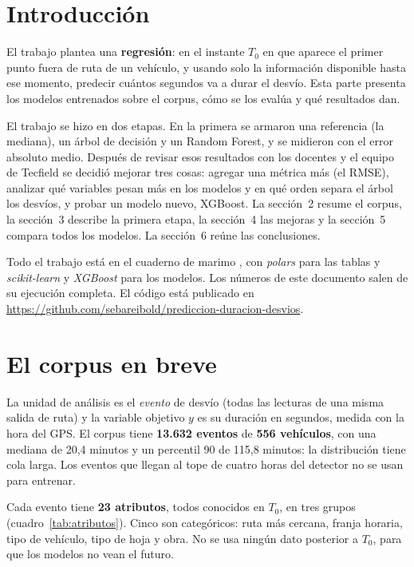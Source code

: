\documentclass[11pt,a4paper]{article}
\newcommand{\campo}[1]{\texttt{\detokenize{#1}}}
\begin{document}
\tableofcontents
\newpage

\section{Introducción}

El trabajo plantea una \textbf{regresión}: en el instante $T_0$ en que aparece el primer punto fuera de
ruta de un vehículo, y usando solo la información disponible hasta ese momento, predecir cuántos
segundos va a durar el desvío. Esta parte presenta los modelos entrenados sobre el corpus, cómo se los
evalúa y qué resultados dan.

El trabajo se hizo en dos etapas. En la primera se armaron una referencia (la mediana), un árbol de
decisión y un Random Forest, y se midieron con el error absoluto medio. Después de revisar esos
resultados con los docentes y el equipo de Tecfield se decidió mejorar tres cosas: agregar una métrica
más (el RMSE), analizar qué variables pesan más en los modelos y en qué orden separa el árbol los
desvíos, y probar un modelo nuevo, XGBoost. La sección~2 resume el corpus, la sección~3
describe la primera etapa, la sección~4 las mejoras y la sección~5 compara todos los modelos. La
sección~6 reúne las conclusiones.

Todo el trabajo está en el cuaderno de marimo \campo{notebooks/01_exploracion_y_modelos.py}, con
\emph{polars} para las tablas y \emph{scikit-learn} y \emph{XGBoost} para los modelos. Los
números de este documento salen de su ejecución completa. El código está publicado en
\url{https://github.com/sebareibold/prediccion-duracion-desvios}.

\section{El corpus en breve}

La unidad de análisis es el \emph{evento} de desvío (todas las lecturas de una misma salida de ruta) y la
variable objetivo $y$ es su duración en segundos, medida con la hora del GPS. El corpus tiene
\textbf{13.632 eventos} de \textbf{556 vehículos}, con una mediana de 20,4 minutos y un percentil 90 de
115,8 minutos: la distribución tiene cola larga. Los eventos que llegan al tope de cuatro horas del
detector no se usan para entrenar.

Cada evento tiene \textbf{23 atributos}, todos conocidos en $T_0$, en tres grupos (cuadro~\ref{tab:atributos}).
Cinco son categóricos: ruta más cercana, franja horaria, tipo de vehículo, tipo de hoja y obra. No se usa
ningún dato posterior a $T_0$, para que los modelos no vean el futuro.
\end{document}
